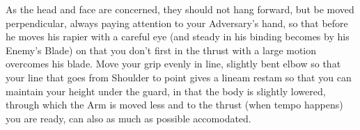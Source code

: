As the head and face are concerned, they should not hang forward, but
be moved perpendicular, always paying attention to your Adversary's
hand, so that before he moves his rapier with a careful eye (and
steady in his binding becomes by his Enemy's Blade) on that you
don't first in the thrust with a large motion overcomes his
blade. Move your grip evenly in line, slightly bent elbow so that your
line that goes from Shoulder to point gives a lineam restam so that
you can maintain your height under the guard, in that the body is
slightly lowered, through which the Arm is moved less and to the thrust
(when tempo happens) you are ready, can also as much as possible accomodated.
